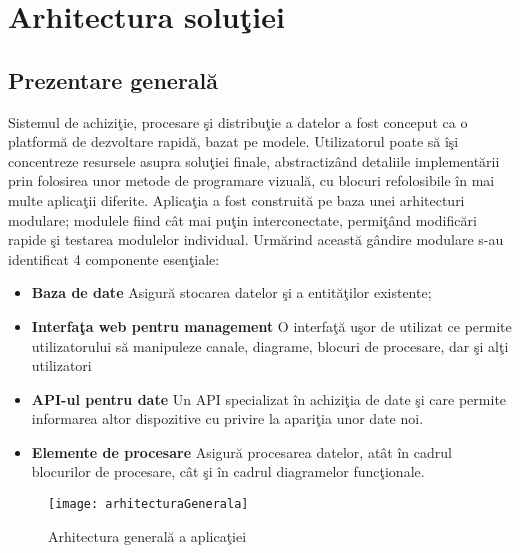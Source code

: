 \chapter{Arhitectura soluţiei}
\label{chapter:arhitecture}
\newlength{\bulletwidth}\settowidth{\bulletwidth}{$\bullet$}
\newcommand{\mitem}{\setlength{\leftskip}{\leftmargin}\hspace*{-\labelsep}\hspace*{-\bulletwidth}$\bullet$\hspace*{\labelsep}}
\newcommand{\mend}{\setlength{\leftskip}{0cm}}
\section{Prezentare generală}
Sistemul de achiziţie, procesare şi distribuţie a datelor a fost conceput ca o platformă de dezvoltare rapidă, bazat pe modele. Utilizatorul poate să îşi concentreze resursele asupra soluţiei finale, abstractizând detaliile implementării prin folosirea unor metode de programare vizuală, cu blocuri refolosibile în mai multe aplicaţii diferite. 
Aplicaţia a fost construită pe baza unei arhitecturi modulare; modulele fiind cât mai puţin interconectate, permiţând modificări rapide şi testarea modulelor individual. Urmărind această gândire modulare s-au identificat 4 componente esenţiale: 
\begin{itemize}
	\item \textbf{Baza de date} Asigură stocarea datelor şi a entităţilor existente;
	\item \textbf{Interfaţa web pentru management} O interfaţă uşor de utilizat ce permite  utilizatorului să manipuleze canale, diagrame, blocuri de procesare, dar şi alţi utilizatori
	\item \textbf{API-ul pentru date} Un API specializat în achiziţia de  date şi care permite informarea altor dispozitive cu privire la apariţia unor date noi.
	\item \textbf{Elemente de procesare} Asigură procesarea datelor, atât în cadrul blocurilor de procesare, cât şi în cadrul diagramelor funcţionale.
\end{itemize}
\begin{figure}
	\centering
	\texttt{[image: arhitecturaGenerala]}
	\caption{Arhitectura generală a aplicaţiei}
	\label{fig:arhitecture}
\end{figure}

